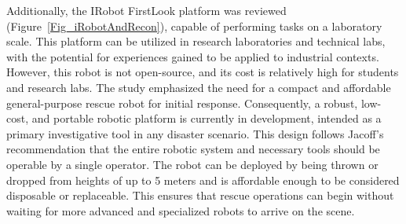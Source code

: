 \documentclass[conference]{IEEEtran}
\begin{document}
Additionally, the IRobot FirstLook platform \cite{iRobot_FirstLook} was reviewed (Figure~\ref{Fig_iRobotAndRecon}), capable of performing tasks on a laboratory scale. This platform can be utilized in research laboratories and technical labs, with the potential for experiences gained to be applied to industrial contexts. However, this robot is not open-source, and its cost is relatively high for students and research labs. The study emphasized the need for a compact and affordable general-purpose rescue robot for initial response. Consequently, a robust, low-cost, and portable robotic platform is currently in development, intended as a primary investigative tool in any disaster scenario. This design follows Jacoff's recommendation that the entire robotic system and necessary tools should be operable by a single operator. The robot can be deployed by being thrown or dropped from heights of up to 5 meters and is affordable enough to be considered disposable or replaceable. This ensures that rescue operations can begin without waiting for more advanced and specialized robots to arrive on the scene.
\end{document}
